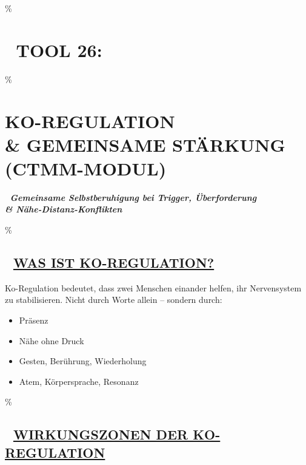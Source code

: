 \hypertarget{tool-26}{\%
\section{\texorpdfstring{🧠 \textbf{TOOL 26:} }{🧠 TOOL 26: }}\label{tool-26}}

\hypertarget{ko-regulation-gemeinsame-stuxe4rkung-ctmm-modul}{\%
\section{\texorpdfstring{\textbf{KO-REGULATION \\& GEMEINSAME STÄRKUNG (CTMM-MODUL)}}{KO-REGULATION \\& GEMEINSAME STÄRKUNG (CTMM-MODUL)}}\label{ko-regulation-gemeinsame-stuxe4rkung-ctmm-modul}}

🧩 \emph{\textbf{Gemeinsame Selbstberuhigung bei Trigger, Überforderung \\& Nähe-Distanz-Konflikten}}

\hypertarget{was-ist-ko-regulation}{\%
\subsection{\texorpdfstring{🤝 \textbf{\ul{WAS IST KO-REGULATION?}}}{🤝 WAS IST KO-REGULATION?}}\label{was-ist-ko-regulation}}

Ko-Regulation bedeutet, dass zwei Menschen einander helfen, ihr Nervensystem zu stabilisieren. Nicht durch Worte allein -- sondern durch:

\begin{itemize}
\tightlist
\item
  Präsenz
\item
  Nähe ohne Druck
\item
  Gesten, Berührung, Wiederholung
\item
  Atem, Körpersprache, Resonanz
\end{itemize}

\hypertarget{wirkungszonen-der-ko-regulation}{\%
\subsection{\texorpdfstring{💞 \textbf{\ul{WIRKUNGSZONEN DER KO-REGULATION}}}{💞 WIRKUNGSZONEN DER KO-REGULATION}}\label{wirkungszonen-der-ko-regulation}}

